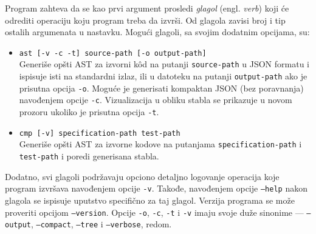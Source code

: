 Program zahteva da se kao prvi argument prosledi \emph{glagol} (engl. \emph{verb}) koji će odrediti operaciju koju program treba da izvrši. Od glagola zavisi broj i tip ostalih argumenata u nastavku. Mogući glagoli, sa svojim dodatnim opcijama, su:
\begin{itemize}
    \item \texttt{ast [-v -c -t] source-path [-o output-path]} \\
    Generiše opšti AST za izvorni k\^od na putanji \texttt{source-path} u JSON formatu i ispisuje isti na standardni izlaz, ili u datoteku na putanji \texttt{output-path} ako je prisutna opcija \texttt{-o}. Moguće je generisati kompaktan JSON (bez poravnanja) navođenjem opcije \texttt{-c}. Vizualizacija u obliku stabla se prikazuje u novom prozoru ukoliko je prisutna opcija \texttt{-t}.
    \item \texttt{cmp [-v] specification-path test-path} \\
    Generiše opšti AST za izvorne kodove na putanjama \texttt{specification-path} i \texttt{test-path} i poredi generisana stabla. 
\end{itemize} 

Dodatno, svi glagoli podržavaju opciono detaljno logovanje operacija koje program izvršava navođenjem opcije \texttt{-v}. Takođe, navođenjem opcije \texttt{--help} nakon glagola se ispisuje uputstvo specifično za taj glagol. Verzija programa se može proveriti opcijom \texttt{--version}. Opcije \texttt{-o}, \texttt{-c}, \texttt{-t} i \texttt{-v} imaju svoje duže sinonime --- \texttt{--output}, \texttt{--compact}, \texttt{--tree} i \texttt{--verbose}, redom.


